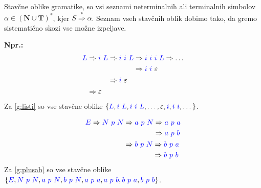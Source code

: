 \documentclass{article}
\newcommand{\Ex}{\textbf{Npr.:}\ }
\newcommand{\Set}[1]{\mathbf{#1}}
\newcommand{\Symbol}[1]{\textcolor{blue}{#1}}
\newcommand{\Terminals}{\Set{T}}
\newcommand{\NonTerminals}{\Set{N}}
\newcommand{\StartSymbol}{S}
\newcommand{\Null}{\varepsilon}
\newcommand{\Derive}{\Rightarrow}
\newcommand{\DeriveStar}{\overset{\ast}{\Rightarrow}}
\newcommand{\Seq}{\ }
\newcommand{\Kleene}[1]{#1^\ast}
\begin{document}
Stavčne oblike gramatike, so vsi seznami neterminalnih ali terminalnih simbolov $\alpha \in \Kleene{(\NonTerminals \cup \Terminals)}$, kjer $\StartSymbol \DeriveStar \alpha$.
Seznam vseh stavčnih oblik dobimo tako, da gremo sistematično skozi vse možne izpeljave.

\Ex
  \begin{equation*}
    \Symbol{L} \begin{aligned}[t]
      &\Derive \Symbol{i} \Seq \Symbol{L} \begin{aligned}[t]
        &\Derive \Symbol{i} \Seq \Symbol{i} \Seq \Symbol{L} \begin{aligned}[t]
          &\Derive \Symbol{i} \Seq \Symbol{i} \Seq \Symbol{i} \Seq \Symbol{L} \Derive \dots\\
          &\Derive \Symbol{i} \Seq \Symbol{i} \Seq \Null 
        \end{aligned}\\
        &\Derive \Symbol{i} \Seq \Null 
      \end{aligned}\\
      &\Derive \Null
    \end{aligned}
  \end{equation*}
Za \ref{g:listi} so vse stavčne oblike $\{\Symbol{L}, \Symbol{i} \Seq \Symbol{L}, \Symbol{i} \Seq \Symbol{i} \Seq \Symbol{L}, \dots, \Null, \Symbol{i}, \Symbol{i} \Seq \Symbol{i}, \dots\}$.

  \begin{equation*}
    \Symbol{E} \Derive \Symbol{N} \Seq \Symbol{p} \Seq \Symbol{N} \begin{aligned}[t]
      &\Derive \Symbol{a} \Seq \Symbol{p} \Seq \Symbol{N} \begin{aligned}[t]
        &\Derive \Symbol{a} \Seq \Symbol{p} \Seq \Symbol{a}\\
        &\Derive \Symbol{a} \Seq \Symbol{p} \Seq \Symbol{b}\\
      \end{aligned}\\
      &\Derive \Symbol{b} \Seq \Symbol{p} \Seq \Symbol{N} \begin{aligned}[t]
        &\Derive \Symbol{b} \Seq \Symbol{p} \Seq \Symbol{a}\\
        &\Derive \Symbol{b} \Seq \Symbol{p} \Seq \Symbol{b}\\
      \end{aligned}
    \end{aligned}
  \end{equation*}
Za \ref{g:plusab} so vse stavčne oblike $\{\Symbol{E}, \Symbol{N} \Seq \Symbol{p} \Seq \Symbol{N}, \Symbol{a} \Seq \Symbol{p} \Seq \Symbol{N}, \Symbol{b} \Seq \Symbol{p} \Seq \Symbol{N}, \Symbol{a} \Seq \Symbol{p} \Seq \Symbol{a}, \Symbol{a} \Seq \Symbol{p} \Seq \Symbol{b}, \Symbol{b} \Seq \Symbol{p} \Seq \Symbol{a}, \Symbol{b} \Seq \Symbol{p} \Seq \Symbol{b} \}$.
\end{document}
